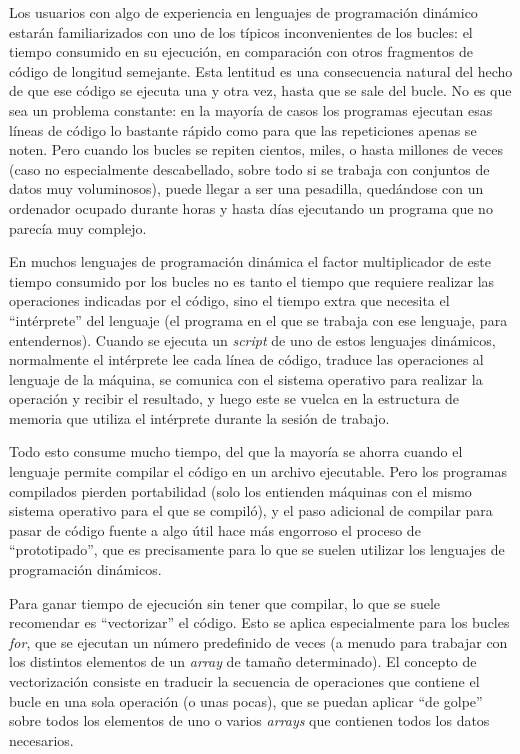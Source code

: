 ﻿\documentclass{article}
\begin{document}
{{Los usuarios con algo de experiencia en lenguajes de programación
dinámico estarán familiarizados con uno de los típicos inconvenientes
de los bucles: el tiempo consumido en su ejecución, en comparación con otros
fragmentos de código de longitud semejante. Esta lentitud es una
consecuencia natural del hecho de que ese código se ejecuta una y otra vez,
hasta que se sale del bucle. No es que sea un problema constante:
en la mayoría de casos los programas ejecutan esas líneas de código lo
bastante rápido como para que las repeticiones apenas se noten. Pero
cuando los bucles se repiten cientos, miles, o hasta millones de veces
(caso no especialmente descabellado, sobre todo si se trabaja con
conjuntos de datos muy voluminosos), puede llegar a ser una pesadilla,
quedándose con un ordenador ocupado durante horas y hasta días
ejecutando un programa que no parecía muy complejo.

En muchos lenguajes de programación dinámica
el factor multiplicador de este tiempo consumido por los bucles no
es tanto el tiempo que requiere realizar las operaciones indicadas por
el código, sino el tiempo extra que necesita el ``intérprete'' del lenguaje
(el programa en el que se trabaja con ese lenguaje, para entendernos).
Cuando se ejecuta un \emph{script} de uno de estos lenguajes dinámicos,
normalmente el intérprete lee cada línea de código, traduce las operaciones al
lenguaje de la máquina, se comunica con el sistema operativo para
realizar la operación y recibir el resultado, y luego este se vuelca en la
estructura de memoria que utiliza el intérprete durante la sesión de trabajo.

Todo esto consume mucho tiempo, del que la mayoría se ahorra cuando el lenguaje
permite compilar el código en un archivo ejecutable. Pero los programas
compilados pierden portabilidad (solo los entienden máquinas con el
mismo sistema operativo para el que se compiló), y el paso adicional
de compilar para pasar de código fuente a algo útil hace más engorroso
el proceso de ``prototipado'', que es precisamente para lo que se suelen
utilizar los lenguajes de programación dinámicos.

Para ganar tiempo de ejecución sin tener que compilar, lo que se suele
recomendar es ``vectorizar'' el código. Esto se aplica especialmente para
los bucles \emph{for}, que se ejecutan un número predefinido de veces
(a menudo para trabajar con los distintos elementos de un \emph{array}
de tamaño determinado). El concepto de vectorización consiste en
traducir la secuencia de operaciones que contiene el bucle en una sola
operación (o unas pocas), que se puedan aplicar ``de golpe'' sobre todos los 
elementos de uno o varios \emph{arrays} que contienen todos los datos
necesarios.

}}
\end{document}
